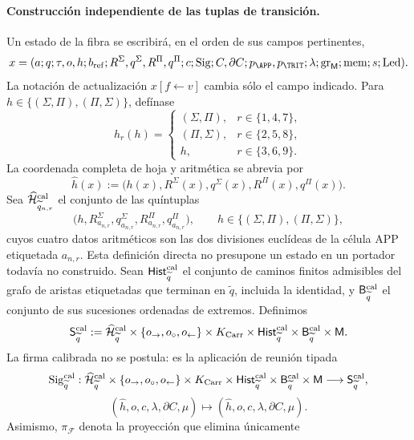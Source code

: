 \paragraph{Construcción independiente de las tuplas de transición.}
Un estado de la fibra se escribirá, en el orden de sus campos pertinentes,
\[
 x=(a;q;\tau,o,h;b_{\rm ref};
       R^\Sigma,q^\Sigma,R^\Pi,q^\Pi;c;
       \operatorname{Sig};C,\partial C;p_{\APP},p_{\TRIT};
       \lambda;\operatorname{gr}_{\mathsf M};\operatorname{mem};
       s;\operatorname{Led}).
\]
La notación de actualización \(x[f\leftarrow v]\) cambia sólo el campo
indicado. Para \(h\in\{(\Sigma,\Pi),(\Pi,\Sigma)\}\), defínase
\[
 h_r(h)=
 \begin{cases}
  (\Sigma,\Pi),&r\in\{1,4,7\},\\
  (\Pi,\Sigma),&r\in\{2,5,8\},\\
 h,&r\in\{3,6,9\}.
 \end{cases}
\]
La coordenada completa de hoja y aritmética se abrevia por
\[
 \widehat h(x):=
 \bigl(h(x),R^\Sigma(x),q^\Sigma(x),R^\Pi(x),q^\Pi(x)\bigr).
\]
Sea \(\widehat{\mathcal H}^{\rm cal}_{\widetilde q_{n,r}}\) el conjunto de
las quíntuplas
\[
 \bigl(h,R^\Sigma_{a_{n,r}},q^\Sigma_{a_{n,r}},
          R^\Pi_{a_{n,r}},q^\Pi_{a_{n,r}}\bigr),
 \qquad
 h\in\{(\Sigma,\Pi),(\Pi,\Sigma)\},
\]
cuyos cuatro datos aritméticos son las dos divisiones euclídeas de la célula
APP etiquetada \(a_{n,r}\). Esta definición directa no presupone un estado
en un portador todavía no construido. Sean
\(\mathsf{Hist}^{\rm cal}_{\widetilde q}\) el conjunto de caminos finitos
admisibles del grafo de aristas etiquetadas que terminan en
\(\widetilde q\), incluida la identidad, y
\(\mathsf B^{\rm cal}_{\widetilde q}\) el conjunto de sus sucesiones
ordenadas de extremos. Definimos
\[
 \mathsf S^{\rm cal}_{\widetilde q}:=
 \widehat{\mathcal H}^{\rm cal}_{\widetilde q}
 \times\{o_{\rightarrow},o_{\circ},o_{\leftarrow}\}
 \times K_{\rm Carr}\times
 \mathsf{Hist}^{\rm cal}_{\widetilde q}\times
 \mathsf B^{\rm cal}_{\widetilde q}\times\mathsf M .
\]
La firma calibrada no se postula: es la aplicación de reunión tipada
\[
 \operatorname{Sig}^{\rm cal}_{\widetilde q}:
 \widehat{\mathcal H}^{\rm cal}_{\widetilde q}
 \times\{o_{\rightarrow},o_{\circ},o_{\leftarrow}\}
 \times K_{\rm Carr}\times
 \mathsf{Hist}^{\rm cal}_{\widetilde q}\times
 \mathsf B^{\rm cal}_{\widetilde q}\times\mathsf M
 \longrightarrow\mathsf S^{\rm cal}_{\widetilde q},
\]
\[
 (\widehat h,o,c,\lambda,\partial C,\mu)
 \longmapsto(\widehat h,o,c,\lambda,\partial C,\mu).
\]
Asimismo, \(\pi_{\mathcal F}\) denota la proyección que elimina únicamente
